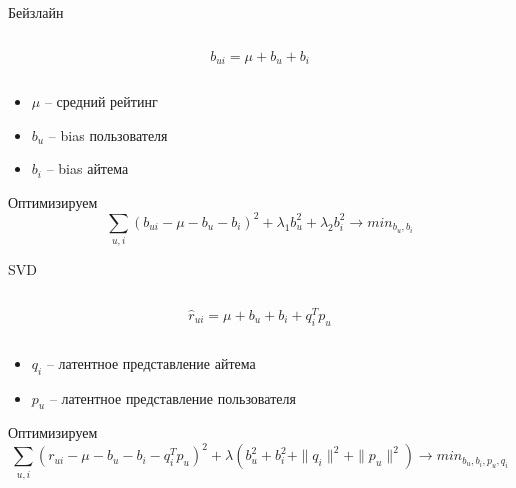 \documentclass[11pt,aspectratio=169,handout]{beamer}
\begin{document}
\begin{frame}{Бейзлайн \cite{KOREN}}

\begin{columns}
\begin{column}{0.2\textwidth} 
\end{column}
\begin{column}{0.5\textwidth} 
\begin{tcolorbox}[colback=info!5,colframe=info!80,title=Модель]
\[
b_{ui} = \mu + b_u + b_i
\]
\end{tcolorbox}
\end{column}
\begin{column}{0.2\textwidth} 
\end{column}
\end{columns}

\vfill

\begin{itemize}
\item $\mu$ -- средний рейтинг
\item $b_u$ -- bias пользователя
\item $b_i$ -- bias айтема
\end{itemize}

\vfill

Оптимизируем
\[
\sum_{u, i} (b_{ui} - \mu - b_u - b_i)^2 + \lambda_1 b_u^2 + \lambda_2 b_i^2 \rightarrow min_{b_u, b_i}
\]

\end{frame}

\begin{frame}{SVD}

\begin{columns}
\begin{column}{0.2\textwidth} 
\end{column}
\begin{column}{0.5\textwidth} 
\begin{tcolorbox}[colback=info!5,colframe=info!80,title=Модель]
\[
\hat r_{ui} = \mu + b_u + b_i + q_i^T p_u
\]
\end{tcolorbox}
\end{column}
\begin{column}{0.2\textwidth} 
\end{column}
\end{columns}

\vfill

\begin{itemize}
\item $q_i$ -- латентное представление айтема
\item $p_u$ -- латентное представление пользователя
\end{itemize}

\vfill

Оптимизируем
\[
\sum_{u, i} (r_{ui} - \mu - b_u - b_i - q_i^T p_u)^2 + \lambda (b_u^2 +  b_i^2 + \| q_i \|^2 + \| p_u \|^2) \rightarrow min_{b_u, b_i, p_u, q_i}
\]

\end{frame}
\end{document}
